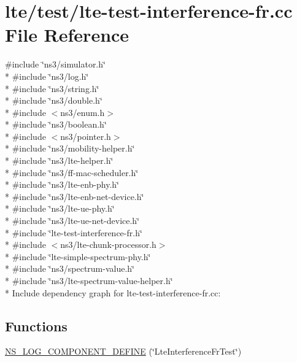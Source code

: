 \hypertarget{lte-test-interference-fr_8cc}{}\section{lte/test/lte-\/test-\/interference-\/fr.cc File Reference}
\label{lte-test-interference-fr_8cc}
{\ttfamily \#include \char`\"{}ns3/simulator.\+h\char`\"{}}\\*
{\ttfamily \#include \char`\"{}ns3/log.\+h\char`\"{}}\\*
{\ttfamily \#include \char`\"{}ns3/string.\+h\char`\"{}}\\*
{\ttfamily \#include \char`\"{}ns3/double.\+h\char`\"{}}\\*
{\ttfamily \#include $<$ns3/enum.\+h$>$}\\*
{\ttfamily \#include \char`\"{}ns3/boolean.\+h\char`\"{}}\\*
{\ttfamily \#include $<$ns3/pointer.\+h$>$}\\*
{\ttfamily \#include \char`\"{}ns3/mobility-\/helper.\+h\char`\"{}}\\*
{\ttfamily \#include \char`\"{}ns3/lte-\/helper.\+h\char`\"{}}\\*
{\ttfamily \#include \char`\"{}ns3/ff-\/mac-\/scheduler.\+h\char`\"{}}\\*
{\ttfamily \#include \char`\"{}ns3/lte-\/enb-\/phy.\+h\char`\"{}}\\*
{\ttfamily \#include \char`\"{}ns3/lte-\/enb-\/net-\/device.\+h\char`\"{}}\\*
{\ttfamily \#include \char`\"{}ns3/lte-\/ue-\/phy.\+h\char`\"{}}\\*
{\ttfamily \#include \char`\"{}ns3/lte-\/ue-\/net-\/device.\+h\char`\"{}}\\*
{\ttfamily \#include \char`\"{}lte-\/test-\/interference-\/fr.\+h\char`\"{}}\\*
{\ttfamily \#include $<$ns3/lte-\/chunk-\/processor.\+h$>$}\\*
{\ttfamily \#include \char`\"{}lte-\/simple-\/spectrum-\/phy.\+h\char`\"{}}\\*
{\ttfamily \#include \char`\"{}ns3/spectrum-\/value.\+h\char`\"{}}\\*
{\ttfamily \#include \char`\"{}ns3/lte-\/spectrum-\/value-\/helper.\+h\char`\"{}}\\*
Include dependency graph for lte-\/test-\/interference-\/fr.cc\+:
\subsection*{Functions}
\begin{DoxyCompactItemize}
\item 
\hyperlink{lte-test-interference-fr_8cc_a3c76ef65f4bf6cb1b9fd2eb4852700f4}{N\+S\+\_\+\+L\+O\+G\+\_\+\+C\+O\+M\+P\+O\+N\+E\+N\+T\+\_\+\+D\+E\+F\+I\+NE} (\char`\"{}Lte\+Interference\+Fr\+Test\char`\"{})
\end{DoxyCompactItemize}
